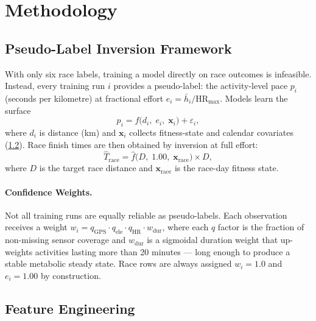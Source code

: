\documentclass[11pt, a4paper]{article}
\begin{document}
\section{Methodology}
\label{sec:methods}

\subsection{Pseudo-Label Inversion Framework}
\label{ssec:pseudo_labels}

With only six race labels, training a model directly on race outcomes
is infeasible.
Instead, every training run $i$ provides a pseudo-label:
the activity-level pace $p_i$ (seconds per kilometre) at fractional effort
$e_i = \bar{h}_i / \mathrm{HR}_{\max}$.
Models learn the surface
\begin{equation}
  p_i = f\bigl(d_i,\; e_i,\; \mathbf{x}_i\bigr) + \varepsilon_i,
  \label{eq:surface}
\end{equation}
where $d_i$ is distance (km) and $\mathbf{x}_i$ collects fitness-state and
calendar covariates (\cref{ssec:features}).
Race finish times are then obtained by inversion at full effort:
\begin{equation}
  \hat{T}_\text{race} = \hat{f}\bigl(D,\; 1.00,\; \mathbf{x}_\text{race}\bigr)
                        \times D,
  \label{eq:inversion}
\end{equation}
where $D$ is the target race distance and $\mathbf{x}_\text{race}$ is the
race-day fitness state.

\paragraph{Confidence Weights.}
Not all training runs are equally reliable as pseudo-labels.
Each observation receives a weight
$w_i = q_\text{GPS} \cdot q_\text{ele} \cdot q_\text{HR} \cdot w_\text{dur}$,
where each $q$ factor is the fraction of non-missing sensor coverage and
$w_\text{dur}$ is a sigmoidal duration weight that up-weights activities
lasting more than 20 minutes --- long enough to produce a stable metabolic
steady state.
Race rows are always assigned $w_i = 1.0$ and $e_i = 1.00$ by construction.

\subsection{Feature Engineering}
\label{ssec:features}
\end{document}
